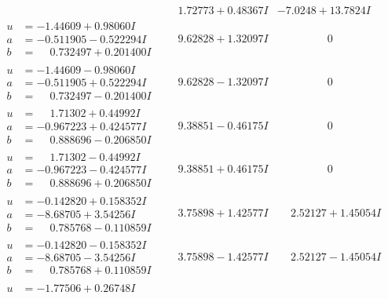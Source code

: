 \documentclass[1p]{elsarticle_modified}
\theoremstyle{definition}
\begin{document}
$$\begin{array}{c|c|c}
 & \phantom{-}1.72773 + 0.48367 I & -7.0248 + 13.7824 I \\ \hline\begin{aligned}
u &= -1.44609 + 0.98060 I \\
a &= -0.511905 - 0.522294 I \\
b &= \phantom{-}0.732497 + 0.201400 I\end{aligned}
 & \phantom{-}9.62828 + 1.32097 I & \phantom{-0.000000 } 0 \\ \hline\begin{aligned}
u &= -1.44609 - 0.98060 I \\
a &= -0.511905 + 0.522294 I \\
b &= \phantom{-}0.732497 - 0.201400 I\end{aligned}
 & \phantom{-}9.62828 - 1.32097 I & \phantom{-0.000000 } 0 \\ \hline\begin{aligned}
u &= \phantom{-}1.71302 + 0.44992 I \\
a &= -0.967223 + 0.424577 I \\
b &= \phantom{-}0.888696 - 0.206850 I\end{aligned}
 & \phantom{-}9.38851 - 0.46175 I & \phantom{-0.000000 } 0 \\ \hline\begin{aligned}
u &= \phantom{-}1.71302 - 0.44992 I \\
a &= -0.967223 - 0.424577 I \\
b &= \phantom{-}0.888696 + 0.206850 I\end{aligned}
 & \phantom{-}9.38851 + 0.46175 I & \phantom{-0.000000 } 0 \\ \hline\begin{aligned}
u &= -0.142820 + 0.158352 I \\
a &= -8.68705 + 3.54256 I \\
b &= \phantom{-}0.785768 - 0.110859 I\end{aligned}
 & \phantom{-}3.75898 + 1.42577 I & \phantom{-}2.52127 + 1.45054 I \\ \hline\begin{aligned}
u &= -0.142820 - 0.158352 I \\
a &= -8.68705 - 3.54256 I \\
b &= \phantom{-}0.785768 + 0.110859 I\end{aligned}
 & \phantom{-}3.75898 - 1.42577 I & \phantom{-}2.52127 - 1.45054 I \\ \hline\begin{aligned}
u &= -1.77506 + 0.26748 I \\

\end{aligned}
\end{array}$$
\end{document}
